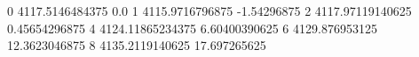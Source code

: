 0 4117.5146484375 0.0
1 4115.9716796875 -1.54296875
2 4117.97119140625 0.45654296875
4 4124.11865234375 6.60400390625
6 4129.876953125 12.3623046875
8 4135.2119140625 17.697265625
